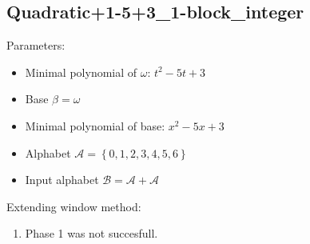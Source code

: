 \subsection{ Quadratic+1-5+3\_1-block\_integer }

\label{subsec:Quadratic+1-5+31-blockinteger}

Parameters:
\begin{itemize}
    \item Minimal polynomial of $\omega$: $ t^{2} - 5t + 3 $
    \item Base $\beta= \omega $
    \item Minimal polynomial of base: $ x^{2} - 5x + 3 $
    \item Alphabet $\mathcal{A} =\left\{0, 1, 2, 3, 4, 5, 6\right\}$
    \item Input alphabet $\mathcal{B} =\mathcal{A}+ \mathcal{A}$
\end{itemize}

\noindent Extending window method:
\begin{enumerate}
    \item Phase 1 was not succesfull. 

\end{enumerate}
